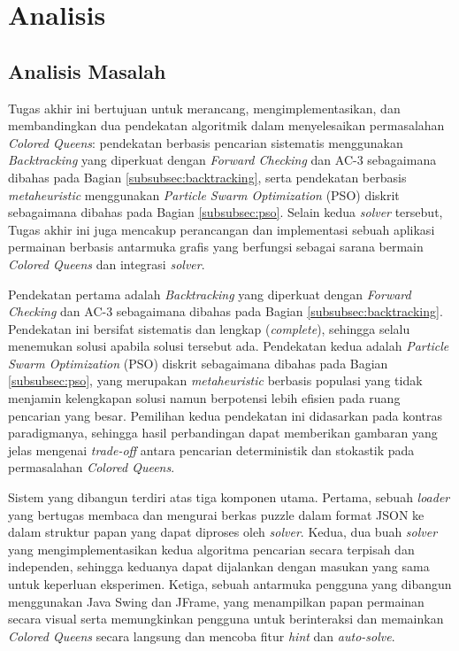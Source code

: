 \chapter{Analisis}
\label{chap:metodologi}

\section{Analisis Masalah}
\label{sec:gambaran-umum}

Tugas akhir ini bertujuan untuk merancang, mengimplementasikan, dan membandingkan dua pendekatan algoritmik dalam menyelesaikan permasalahan \textit{Colored Queens}: pendekatan berbasis pencarian sistematis menggunakan \textit{Backtracking} yang diperkuat dengan \textit{Forward Checking} dan AC-3 sebagaimana dibahas pada Bagian \ref{subsubsec:backtracking}, serta pendekatan berbasis \textit{metaheuristic} menggunakan \textit{Particle Swarm Optimization} (PSO) diskrit sebagaimana dibahas pada Bagian \ref{subsubsec:pso}. Selain kedua \textit{solver} tersebut, Tugas akhir ini juga mencakup perancangan dan implementasi sebuah aplikasi permainan berbasis antarmuka grafis yang berfungsi sebagai sarana bermain \textit{Colored Queens} dan integrasi \textit{solver}.

Pendekatan pertama adalah \textit{Backtracking} yang diperkuat dengan \textit{Forward Checking} dan AC-3 sebagaimana dibahas pada Bagian \ref{subsubsec:backtracking}. Pendekatan ini bersifat sistematis dan lengkap (\textit{complete}), sehingga selalu menemukan solusi apabila solusi tersebut ada. Pendekatan kedua adalah \textit{Particle Swarm Optimization} (PSO) diskrit sebagaimana dibahas pada Bagian \ref{subsubsec:pso}, yang merupakan \textit{metaheuristic} berbasis populasi yang tidak menjamin kelengkapan solusi namun berpotensi lebih efisien pada ruang pencarian yang besar. Pemilihan kedua pendekatan ini didasarkan pada kontras paradigmanya, sehingga hasil perbandingan dapat memberikan gambaran yang jelas mengenai \textit{trade-off} antara pencarian deterministik dan stokastik pada permasalahan \textit{Colored Queens}.

Sistem yang dibangun terdiri atas tiga komponen utama. Pertama, sebuah \textit{loader} yang bertugas membaca dan mengurai berkas puzzle dalam format JSON ke dalam struktur papan yang dapat diproses oleh \textit{solver}. Kedua, dua buah \textit{solver} yang mengimplementasikan kedua algoritma pencarian secara terpisah dan independen, sehingga keduanya dapat dijalankan dengan masukan yang sama untuk keperluan eksperimen. Ketiga, sebuah antarmuka pengguna yang dibangun menggunakan Java Swing dan JFrame, yang menampilkan papan permainan secara visual serta memungkinkan pengguna untuk berinteraksi dan memainkan \textit{Colored Queens} secara langsung dan mencoba fitur \textit{hint} dan \textit{auto-solve}.

